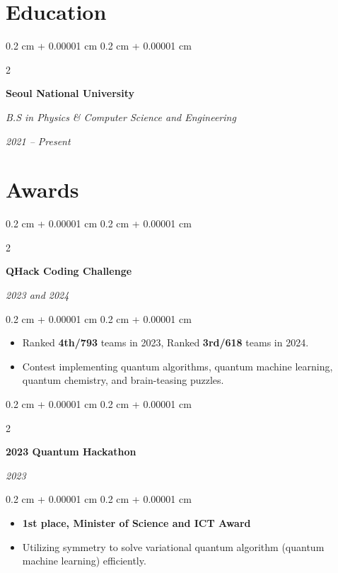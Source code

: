 \documentclass[10pt, letterpaper]{article}
\newenvironment{highlights}{
    \begin{itemize}[
        topsep=0.10 cm,
        parsep=0.10 cm,
        partopsep=0pt,
        itemsep=0pt,
        leftmargin=0.4 cm + 10pt
    ]
}{
    \end{itemize}
} %
\newenvironment{onecolentry}{
    \begin{adjustwidth}{
        0.2 cm + 0.00001 cm
    }{
        0.2 cm + 0.00001 cm
    }
}{
    \end{adjustwidth}
} %
\newenvironment{twocolentry}[2][]{
    \onecolentry
    \def\secondColumn{#2}
    \setcolumnwidth{\fill, 4.5 cm}
    \begin{paracol}{2}
}{
    \switchcolumn \raggedleft \secondColumn
    \end{paracol}
    \endonecolentry
} %
\let\hrefWithoutArrow\href
\renewcommand{\href}[2]{\hrefWithoutArrow{#1}{\ifthenelse{\equal{#2}{}}{ }{#2 }\raisebox{.15ex}{\footnotesize \faExternalLink*}}}
\begin{document}
\section{Education}

\begin{twocolentry}{
        \textit{2021 – Present}
    }
    \textbf{Seoul National University}
    
    \textit{B.S in Physics \& Computer Science and Engineering}
\end{twocolentry}


\section{Awards}

\begin{twocolentry}{
        \textit{2023 and 2024}
    }
    \textbf{QHack Coding Challenge \href{https://qhack.ai}{[link]}}
\end{twocolentry}

\vspace{0.10 cm}
\begin{onecolentry}
    \begin{highlights}
        \item Ranked \textbf{4th/793} teams in 2023, Ranked \textbf{3rd/618} teams in 2024.
        \item Contest implementing quantum algorithms, quantum machine learning, quantum chemistry, and brain-teasing puzzles.
    \end{highlights}
\end{onecolentry}

\vspace{0.2 cm}

\begin{twocolentry}{
        \textit{2023}
    }
    \textbf{2023 Quantum Hackathon \href{https://qhackathon.kr/}{[link]}}
\end{twocolentry}

\vspace{0.10 cm}
\begin{onecolentry}
    \begin{highlights}
        \item \textbf{1st place, Minister of Science and ICT Award}
        \item Utilizing symmetry to solve variational quantum algorithm (quantum machine learning) efficiently.
    \end{highlights}
\end{onecolentry}
\end{document}
